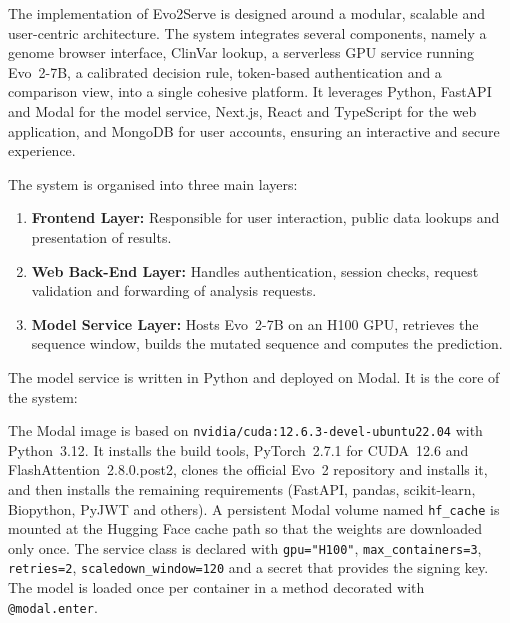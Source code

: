 \newcommand{\ps}[2]{\par\noindent\hspace*{#1pt}#2\par\vspace{-3pt}}
\vspace{-6pt}
The implementation of Evo2Serve is designed around a modular, scalable and user-centric architecture. The system integrates several components, namely a genome browser interface, ClinVar lookup, a serverless GPU service running Evo~2-7B, a calibrated decision rule, token-based authentication and a comparison view, into a single cohesive platform. It leverages Python, FastAPI and Modal for the model service, Next.js, React and TypeScript for the web application, and MongoDB for user accounts, ensuring an interactive and secure experience.

The system is organised into three main layers:
\begin{enumerate}
\item \textbf{Frontend Layer:} Responsible for user interaction, public data lookups and presentation of results.
\item \textbf{Web Back-End Layer:} Handles authentication, session checks, request validation and forwarding of analysis requests.
\item \textbf{Model Service Layer:} Hosts Evo~2-7B on an H100 GPU, retrieves the sequence window, builds the mutated sequence and computes the prediction.
\end{enumerate}

The model service is written in Python and deployed on Modal. It is the core of the system:

The Modal image is based on \texttt{nvidia/cuda:12.6.3-devel-ubuntu22.04} with Python~3.12. It installs the build tools, PyTorch~2.7.1 for CUDA~12.6 and FlashAttention~2.8.0.post2, clones the official Evo~2 repository and installs it, and then installs the remaining requirements (FastAPI, pandas, scikit-learn, Biopython, PyJWT and others). A persistent Modal volume named \texttt{hf\_cache} is mounted at the Hugging Face cache path so that the weights are downloaded only once. The service class is declared with \texttt{gpu="H100"}, \texttt{max\_containers=3}, \texttt{retries=2}, \texttt{scaledown\_window=120} and a secret that provides the signing key. The model is loaded once per container in a method decorated with \texttt{@modal.enter}.

